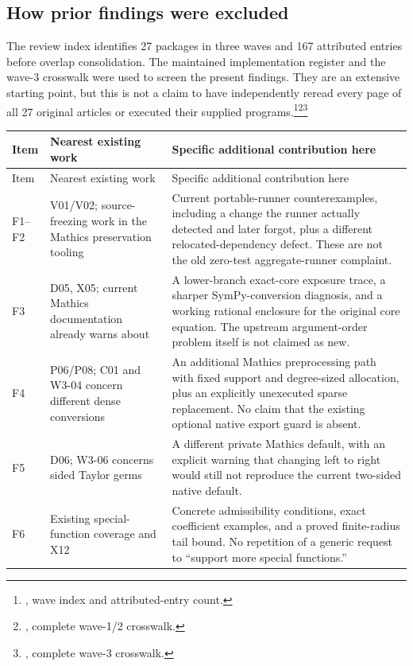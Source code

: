 \documentclass[11pt,letterpaper]{article}
\newcommand{\code}[1]{\texttt{\detokenize{#1}}}
\newcommand{\src}[2]{\footnote{\cite{#1}, #2.}}
\begin{document}
\subsection{How prior findings were excluded}

The review index identifies 27 packages in three waves and 167 attributed entries before overlap consolidation. The maintained implementation register and the wave-3 crosswalk were used to screen the present findings. They are an extensive starting point, but this is not a claim to have independently reread every page of all 27 original articles or executed their supplied programs.\src{reviews}{wave index and attributed-entry count}\src{status}{complete wave-1/2 crosswalk}\src{wave3}{complete wave-3 crosswalk}

\begin{longtable}{P{.10\linewidth}P{.28\linewidth}P{.53\linewidth}}
\toprule
Item & Nearest existing work & Specific additional contribution here \\
\midrule\endfirsthead
\toprule Item & Nearest existing work & Specific additional contribution here \\
\midrule\endhead
F1--F2 & V01/V02; source-freezing work in the Mathics preservation tooling & Current portable-runner counterexamples, including a change the runner actually detected and later forgot, plus a different relocated-dependency defect. These are not the old zero-test aggregate-runner complaint. \\
F3 & D05, X05; current Mathics documentation already warns about \code{ProductLog} & A lower-branch exact-core exposure trace, a sharper SymPy-conversion diagnosis, and a working rational enclosure for the original core equation. The upstream argument-order problem itself is not claimed as new. \\
F4 & P06/P08; C01 and W3-04 concern different dense conversions & An additional Mathics preprocessing path with fixed support and degree-sized allocation, plus an explicitly unexecuted sparse replacement. No claim that the existing optional native export guard is absent. \\
F5 & D06; W3-06 concerns sided Taylor germs & A different private Mathics \code{Limit} default, with an explicit warning that changing left to right would still not reproduce the current two-sided native default. \\
F6 & Existing special-function coverage and X12 & Concrete admissibility conditions, exact coefficient examples, and a proved finite-radius tail bound. No repetition of a generic request to ``support more special functions.'' \\
\bottomrule
\end{longtable}
\end{document}
